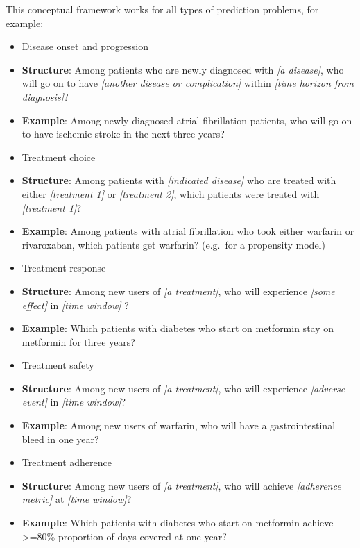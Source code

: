 \documentclass[11pt]{book}
\providecommand{\tightlist}{%
  \setlength{\itemsep}{0pt}\setlength{\parskip}{0pt}}
\theoremstyle{definition}
\theoremstyle{definition}
\theoremstyle{definition}
\theoremstyle{remark}
\begin{document}
This conceptual framework works for all types of prediction problems,
for example:

\begin{itemize}
\tightlist
\item
  Disease onset and progression
\item
  \textbf{Structure}: Among patients who are newly diagnosed with
  \emph{{[}a disease{]}}, who will go on to have \emph{{[}another
  disease or complication{]}} within \emph{{[}time horizon from
  diagnosis{]}}?
\item
  \textbf{Example}: Among newly diagnosed atrial fibrillation patients,
  who will go on to have ischemic stroke in the next three years?
\item
  Treatment choice
\item
  \textbf{Structure}: Among patients with \emph{{[}indicated disease{]}}
  who are treated with either \emph{{[}treatment 1{]}} or
  \emph{{[}treatment 2{]}}, which patients were treated with
  \emph{{[}treatment 1{]}}?
\item
  \textbf{Example}: Among patients with atrial fibrillation who took
  either warfarin or rivaroxaban, which patients get warfarin? (e.g.~for
  a propensity model)
\item
  Treatment response
\item
  \textbf{Structure}: Among new users of \emph{{[}a treatment{]}}, who
  will experience \emph{{[}some effect{]}} in \emph{{[}time window{]}} ?
\item
  \textbf{Example}: Which patients with diabetes who start on metformin
  stay on metformin for three years?
\item
  Treatment safety
\item
  \textbf{Structure}: Among new users of \emph{{[}a treatment{]}}, who
  will experience \emph{{[}adverse event{]}} in \emph{{[}time
  window{]}}?
\item
  \textbf{Example}: Among new users of warfarin, who will have a
  gastrointestinal bleed in one year?
\item
  Treatment adherence
\item
  \textbf{Structure}: Among new users of \emph{{[}a treatment{]}}, who
  will achieve \emph{{[}adherence metric{]}} at \emph{{[}time
  window{]}}?
\item
  \textbf{Example}: Which patients with diabetes who start on metformin
  achieve \textgreater{}=80\% proportion of days covered at one year?
\end{itemize}
\end{document}

